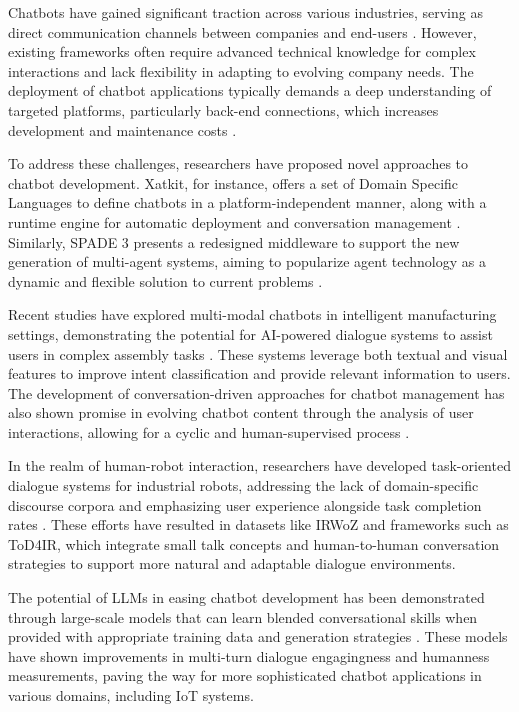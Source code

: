 \documentclass{ieeeaccess}
\begin{document}
Chatbots have gained significant traction across various industries, serving as direct communication channels between companies and end-users \cite{8960373}. However, existing frameworks often require advanced technical knowledge for complex interactions and lack flexibility in adapting to evolving company needs. The deployment of chatbot applications typically demands a deep understanding of targeted platforms, particularly back-end connections, which increases development and maintenance costs \cite{8960373}.

To address these challenges, researchers have proposed novel approaches to chatbot development. Xatkit, for instance, offers a set of Domain Specific Languages to define chatbots in a platform-independent manner, along with a runtime engine for automatic deployment and conversation management \cite{8960373}. Similarly, SPADE 3 presents a redesigned middleware to support the new generation of multi-agent systems, aiming to popularize agent technology as a dynamic and flexible solution to current problems \cite{9207929}.

Recent studies have explored multi-modal chatbots in intelligent manufacturing settings, demonstrating the potential for AI-powered dialogue systems to assist users in complex assembly tasks \cite{9440470}. These systems leverage both textual and visual features to improve intent classification and provide relevant information to users. The development of conversation-driven approaches for chatbot management has also shown promise in evolving chatbot content through the analysis of user interactions, allowing for a cyclic and human-supervised process \cite{9681834}.

In the realm of human-robot interaction, researchers have developed task-oriented dialogue systems for industrial robots, addressing the lack of domain-specific discourse corpora and emphasizing user experience alongside task completion rates \cite{9869659}. These efforts have resulted in datasets like IRWoZ and frameworks such as ToD4IR, which integrate small talk concepts and human-to-human conversation strategies to support more natural and adaptable dialogue environments.

The potential of LLMs in easing chatbot development has been demonstrated through large-scale models that can learn blended conversational skills when provided with appropriate training data and generation strategies \cite{roller-etal-2021-recipes}. These models have shown improvements in multi-turn dialogue engagingness and humanness measurements, paving the way for more sophisticated chatbot applications in various domains, including IoT systems. 
\end{document}
